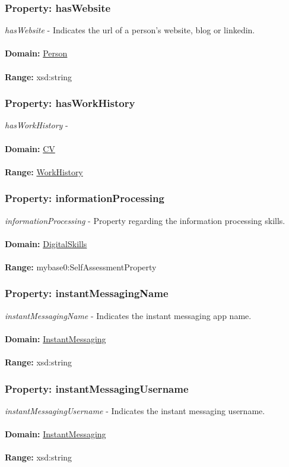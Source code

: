 \documentclass[a4paper,12pt]{article}
\numberwithin{equation}{section}
\begin{document}
\subsubsection{Property: hasWebsite}\hypertarget{hasWebsite}{}
\textit{hasWebsite} - Indicates the url of a person's website, blog or linkedin.
\\\\
\textbf{Domain:} \hyperlink{Person}{Person} 
\\\\
\textbf{Range:}  xsd:string

\subsubsection{Property: hasWorkHistory}\hypertarget{hasWorkHistory}{}
\textit{hasWorkHistory} - 
\\\\
\textbf{Domain:} \hyperlink{CV}{CV} 
\\\\
\textbf{Range:}  \hyperlink{WorkHistory}{WorkHistory} 

\subsubsection{Property: informationProcessing}\hypertarget{informationProcessing}{}
\textit{informationProcessing} - Property regarding the information processing skills.
\\\\
\textbf{Domain:} \hyperlink{DigitalSkills}{DigitalSkills} 
\\\\
\textbf{Range:}  mybase0:SelfAssessmentProperty

\subsubsection{Property: instantMessagingName}\hypertarget{instantMessagingName}{}
\textit{instantMessagingName} - Indicates the instant messaging app name.
\\\\
\textbf{Domain:} \hyperlink{InstantMessaging}{InstantMessaging} 
\\\\
\textbf{Range:}  xsd:string

\subsubsection{Property: instantMessagingUsername}\hypertarget{instantMessagingUsername}{}
\textit{instantMessagingUsername} - Indicates the instant messaging username.
\\\\
\textbf{Domain:} \hyperlink{InstantMessaging}{InstantMessaging} 
\\\\
\textbf{Range:}  xsd:string
\end{document}
